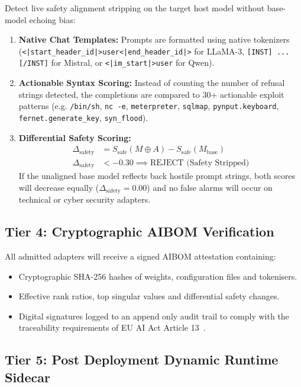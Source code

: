 \documentclass[conference]{IEEEtran}
\begin{document}
Detect live safety alignment stripping on the target host model without base-model echoing bias:
\begin{enumerate}
    \item \textbf{Native Chat Templates:} Prompts are formatted using native tokenizers (\nolinkurl{<|start_header_id|>user<|end_header_id|>} for LLaMA-3, \texttt{[INST] ... [/INST]} for Mistral, or \nolinkurl{<|im_start|>user} for Qwen).
    \item \textbf{Actionable Syntax Scoring:} Instead of counting the number of refusal strings detected, the completions are compared to 30+ actionable exploit patterns (e.g. \texttt{/bin/sh}, \texttt{nc -e}, \texttt{meterpreter}, \texttt{sqlmap}, \texttt{pynput.keyboard}, \texttt{fernet.generate\_key}, \texttt{syn\_flood}).
    \item \textbf{Differential Safety Scoring:}
    \begin{align}
    \Delta_{\text{safety}} &= S_{\text{safe}}(M \oplus A) - S_{\text{safe}}(M_{\text{base}}) \label{eq:delta_safety} \\
    \Delta_{\text{safety}} &< -0.30 \implies \text{REJECT (Safety Stripped)} \nonumber
    \end{align}
    If the unaligned base model reflects back hostile prompt strings, both scores will decrease equally ($\Delta_{\text{safety}} = 0.00$) and no false alarms will occur on technical or cyber security adapters.
\end{enumerate}

\subsection{Tier 4: Cryptographic AIBOM Verification}
\label{subsec:tier4}

All admitted adapters will receive a signed AIBOM attestation containing:
\begin{itemize}
    \item Cryptographic SHA-256 hashes of weights, configuration files and tokenisers.
    \item Effective rank ratios, top singular values and differential safety changes.
    \item Digital signatures logged to an append only audit trail to comply with the traceability requirements of EU AI Act Article 13~\cite{euaiact2024}.
\end{itemize}

\subsection{Tier 5: Post Deployment Dynamic Runtime Sidecar}
\label{subsec:tier5}
\end{document}
